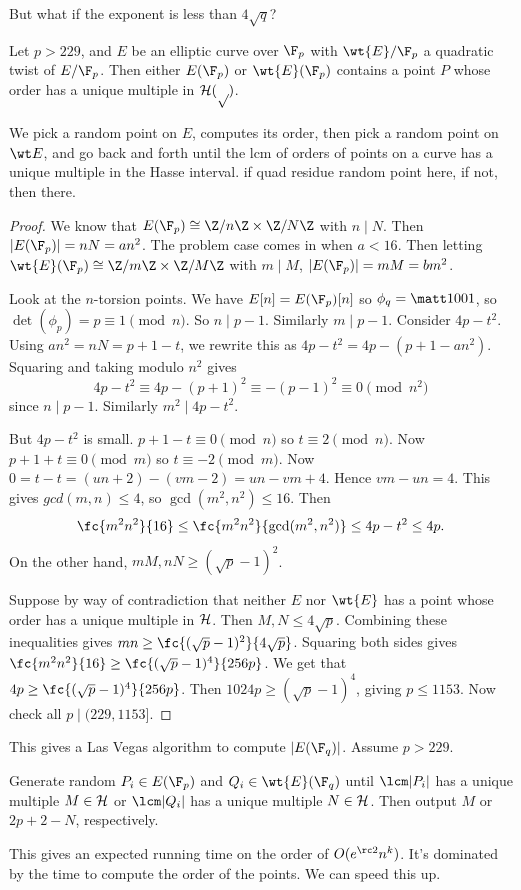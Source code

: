 But what if the exponent is less than $4\sqrt q$?
\begin{thm}[Mestre]
Let $p>229$, and $E$ be an elliptic curve over $\F_p$ with $\wt{E}/\F_p$ a quadratic twist of $E/\F_p$. Then either $E(\F_p)$ or $\wt{E}(\F_p)$ contains a point $P$ whose order has a unique multiple in $\cal H(p)$.
\end{thm}
We pick a random point on $E$, computes its order, then pick a random point on $\wt E$, and go back and forth until the lcm of orders of points on a curve has a unique multiple in the Hasse interval. 
if quad residue random point here, if not, then there.
\begin{proof}
We know that $E(\F_p)\cong \Z/n\Z\times \Z/N\Z$ with $n\mid N$. Then $|E(\F_p)|=nN=an^2$. The problem case comes in when $a<16$. Then letting $\wt{E}(\F_p)\cong \Z/m\Z\times \Z/M\Z$ with $m\mid M$, $|E(\F_p)|=mM=bm^2$.

Look at the $n$-torsion points. We have $E[n]=E(\F_p)[n]$ so $\phi_q%
=\matt 1001$, so $\det(\phi_p)%
=p\equiv 1\pmod n$. So $n\mid p-1$. Similarly $m\mid p-1$. Consider $4p-t^2$. %
Using $an^2=nN=p+1-t$, we rewrite this as $4p-t^2=4p-(p+1-an^2)$. Squaring and taking modulo $n^2$ gives
\[
4p-t^2\equiv 4p-(p+1)^2\equiv -(p-1)^2\equiv 0\pmod {n^2}
\]
since $n\mid p-1$. Similarly $m^2\mid 4p-t^2$.

But $4p-t^2$ is small. $p+1-t\equiv 0\pmod n$ so $t\equiv 2\pmod n$. Now $p+1+t\equiv 0\pmod m$ so $t\equiv -2\pmod m$. Now $0=t-t=(un+2)-(vm-2)=un-vm+4$. Hence $vm-un=4$. This gives $gcd(m,n)\le 4$, so $\gcd(m^2,n^2)\le 16$. Then 
\[\fc{m^2n^2}{16}\le \fc{m^2n^2}{\gcd(m^2,n^2)}\le 4p-t^2\le 4p.\]
On the other hand, $mM,nN\ge (\sqrt p-1)^2$.

Suppose by way of contradiction that neither $E$ nor $\wt{E}$ has a point whose order has a unique multiple in $\cal H$. Then $M,N\le 4\sqrt p$. Combining these inequalities gives $mn\ge \fc{(\sqrt p-1)^2}{4\sqrt p}$. Squaring both sides gives $\fc{m^2n^2}{16}\ge \fc{(\sqrt p-1)^4}{256p}$. We get that $4p\ge \fc{(\sqrt p-1)^4}{256p}$. Then $1024p\ge (\sqrt p-1)^4$, giving $p\le 1153$. Now check all $p\mid (229,1153]$. 
\end{proof}
This gives a Las Vegas algorithm to compute $|E(\F_q)|$. Assume $p>229$.
\begin{alg}[Finding $|E(\F_q)|$]
Generate random $P_i\in E(\F_p)$ and $Q_i\in \wt{E}(\F_q)$ until $\lcm|P_i|$ has a unique multiple $M\in \cal H$ or $\lcm |Q_i|$ has a unique multiple $N\in \cal H$. Then output $M$ or $2p+2-N$, respectively.
\end{alg}
This gives an expected running time on the order of $O(e^{\rc 2}n^k)$. It's dominated by the time to compute the order of the points. We can speed this up.

